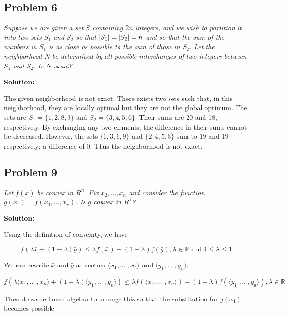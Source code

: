 \documentclass[11pt, a4paper]{article}
\DeclarePairedDelimiter{\abs}{\lvert}{\rvert}
\newcommand{\solution}{ \noindent \textbf{Solution:}}
\newcommand{\problem}[1]{\textit{#1} \medskip}
\begin{document}
\subsection*{Problem 6}

\problem{Suppose we are given a set $S$ containing $2n$ integers, and we wish to partition it into
two sets $S_1$ and $S_2$ so that $\abs{S_1}=\abs{S_2}=n$ and so that the sum of the numbers in $S_1$
is as close as possible to the sum of those in $S_2$. Let the neighborhood $N$ be determined by all
possible interchanges of two integers between $S_1$ and $S_2$. Is $N$ exact?}

\solution


The given neighborhood is not exact. There exists two sets such that, in this neighborhood, they are
locally optimal but they are not the global optimum. The sets are $S_1 = \{1, 2, 8, 9\}$ and $S_2 =
\{3, 4, 5, 6\}$. Their sums are 20 and 18, respectively. By exchanging any two elements, the
difference in their sums cannot be decreased. However, the sets $\{1, 3, 6, 9\}$ and 
$\{2, 4, 5, 8\}$ sum to 19 and 19 respectively: a difference of 0. Thus the neighborhood is not
exact.


\subsection*{Problem 9}
\newcommand{\convexity}[1]{
\begin{equation}
    #1(\la\x+(1-\la)\y) \leq \la #1(\x)+(1-\la) #1(\y), \la \in \mathbb{R}\ \text{and}\ 0\leq\la\leq1
\end{equation}
}

\problem{Let $f(x)$ be convex in $R^n$. Fix $x_2,...,x_n$ and consider the function $g(x_1) =
f(x_1,...,x_n)$. Is $g$ convex in $R^1$?}

\solution

Using the definition of convexity, we have

\newcommand{\la}{\lambda}
\newcommand{\x}{\bar{x}}
\newcommand{\y}{\bar{y}}
\convexity{f}


We can rewrite $\x$ and $\y$ as vectors 
\newcommand{\vecrange}[2]{\langle #1, ...\ , #2 \rangle}
\renewcommand{\x}{\vecrange{x_1}{x_n}}
\renewcommand{\y}{\vecrange{y_1}{y_n}}
$\x$ and $\y$.

\begin{equation}
    f(\la\x+(1-\la)\y) \leq \la f(\x)+(1-\la) f(\y), \la \in \mathbb{R}
\end{equation}

Then do some linear algebra to arrange this so that the substitution for $g(x_1)$ becomes possible
\end{document}
